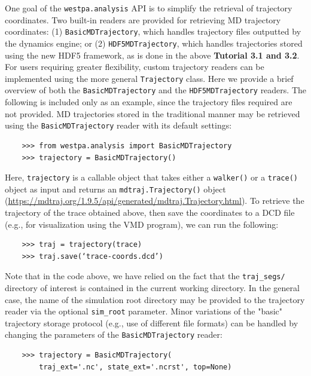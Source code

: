One goal of the \verb|westpa.analysis| API is to simplify the retrieval of trajectory coordinates.
Two built-in readers are provided for retrieving MD trajectory coordinates: (1) \verb|BasicMDTrajectory|, which handles trajectory files outputted by the dynamics engine; or (2) \verb|HDF5MDTrajectory|, which handles trajectories stored using the new HDF5 framework, as is done in the above \textbf{Tutorial 3.1 and 3.2}.
For users requiring greater flexibility, custom trajectory readers can be implemented using the more general \verb|Trajectory| class.
Here we provide a brief overview of both the \verb|BasicMDTrajectory| and the \verb|HDF5MDTrajectory| readers.
The following is included only as an example, since the trajectory files required are not provided.
MD trajectories stored in the traditional manner may be retrieved using the \verb|BasicMDTrajectory| reader with its default settings:

\begin{verbatim}
    >>> from westpa.analysis import BasicMDTrajectory
    >>> trajectory = BasicMDTrajectory()
\end{verbatim}

Here, \verb|trajectory| is a callable object that takes either a \verb|walker()| or a \verb|trace()| object as input and returns an \verb|mdtraj.Trajectory()| object ({\url{https://mdtraj.org/1.9.5/api/generated/mdtraj.Trajectory.html}}).
To retrieve the trajectory of the trace obtained above, then save the coordinates to a DCD file (e.g., for visualization using the VMD program), we can run the following:

\begin{verbatim}
    >>> traj = trajectory(trace)
    >>> traj.save(‘trace-coords.dcd’)
\end{verbatim}

Note that in the code above, we have relied on the fact that the \verb|traj_segs/| directory of interest is contained in the current working directory.
In the general case, the name of the simulation root directory may be provided to the trajectory reader via the optional \verb|sim_root| parameter.
Minor variations of the "basic" trajectory storage protocol (e.g., use of different file formats) can be handled by changing the parameters of the \verb|BasicMDTrajectory| reader: 

\begin{verbatim}
    >>> trajectory = BasicMDTrajectory(
        traj_ext='.nc', state_ext='.ncrst', top=None)
\end{verbatim}

